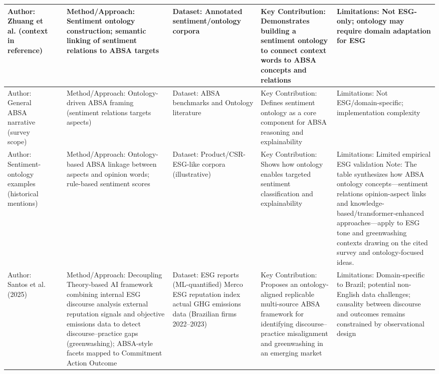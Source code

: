 \documentclass{article}
\begin{document}
\begin{landscape}
\begin{longtable}{p{1.8cm}
p{2.6cm}
p{3.4cm}
p{2.6cm}
p{3.5cm}
p{3.5cm}}
Author: Zhuang et al. (context in reference) & ~ & Method/Approach: Sentiment ontology construction; semantic linking of sentiment relations to ABSA targets & Dataset: Annotated sentiment/ontology corpora & Key Contribution: Demonstrates building a sentiment ontology to connect context words to ABSA concepts and relations & Limitations: Not ESG-only; ontology may require domain adaptation for ESG \\ \hline
Author: General ABSA narrative (survey scope) & ~ & Method/Approach: Ontology-driven ABSA framing (sentiment relations targets aspects) & Dataset: ABSA benchmarks and Ontology literature & Key Contribution: Defines sentiment ontology as a core component for ABSA reasoning and explainability & Limitations: Not ESG/domain-specific; implementation complexity \\ \hline
Author: Sentiment-ontology examples (historical mentions) & ~ & Method/Approach: Ontology-based ABSA linkage between aspects and opinion words; rule-based sentiment scores & Dataset: Product/CSR-ESG-like corpora (illustrative) & Key Contribution: Shows how ontology enables targeted sentiment classification and explainability & Limitations: Limited empirical ESG validation Note: The table synthesizes how ABSA ontology concepts—sentiment relations opinion-aspect links and knowledge-based/transformer-enhanced approaches—apply to ESG tone and greenwashing contexts drawing on the cited survey and ontology-focused ideas. \\ \hline
Author: Santos et al. (2025) & ~ & Method/Approach: Decoupling Theory-based AI framework combining internal ESG discourse analysis external reputation signals and objective emissions data to detect discourse–practice gaps (greenwashing); ABSA-style facets mapped to Commitment Action Outcome & Dataset: ESG reports (ML-quantified) Merco ESG reputation index actual GHG emissions data (Brazilian firms 2022–2023) & Key Contribution: Proposes an ontology-aligned replicable multi-source ABSA framework for identifying discourse–practice misalignment and greenwashing in an emerging market & Limitations: Domain-specific to Brazil; potential non-English data challenges; causality between discourse and outcomes remains constrained by observational design \\ \hline

\end{longtable}
\end{landscape}
\end{document}
